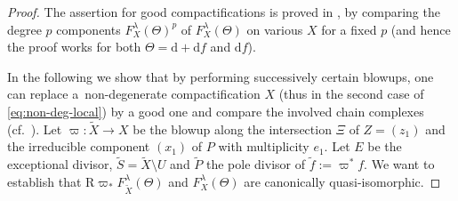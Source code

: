 \documentclass[pdftex]{sigma}
\newcommand{\de}{\mathrm{d}}
\newcommand{\ddRH}{\Theta}
\newcommand{\cpt}{compactification}
\newcommand{\RD}{\mathrm{R}}
\begin{document}
\begin{proof} The assertion for good {\cpt}s is proved in \cite[Theorem~1.7]{Y}, by comparing the degree $p$ components $F_X^\lambda(\ddRH)^p$ of $F_X^\lambda(\ddRH)$ on various $X$ for a fixed $p$ (and hence the proof works for both $\ddRH = \de +\de f$ and $\de f$).

In the following we show that by performing successively certain blowups, one can replace a~non-degenerate {\cpt} $X$ (thus in the second case of \eqref{eq:non-deg-local}) by a good one and compare the involved chain complexes (cf.~\cite[Section~4($b$)]{Y}). Let $\varpi \colon \widetilde{X} \to X$ be the blowup along the intersection $\Xi$ of $Z = (z_1)$ and the irreducible component $(x_1)$ of $P$ with multiplicity $e_1$. Let $E$ be the exceptional divisor, $\widetilde{S} = \widetilde{X}\setminus U$ and $\widetilde{P}$ the pole divisor of $\tilde{f} := \varpi^*f$. We want to establish that $\RD\varpi_*F_{\widetilde{X}}^\lambda(\ddRH)$ and $F_X^\lambda(\ddRH)$ are canonically quasi-isomorphic.


\end{proof}
\end{document}
